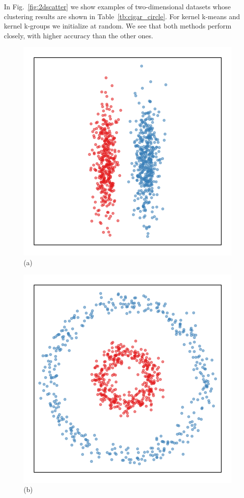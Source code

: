 \documentclass[10pt,journal,compsoc]{IEEEtran}
\begin{document}
In Fig.~\ref{fig:2dscatter} we show examples of two-dimensional
datasets whose clustering results are shown in Table~\ref{tb:cigar_circle}.
For kernel k-means and kernel k-groups we initialize at random.
We see that both methods perform closely, with higher accuracy
than the other ones.

\begin{figure}
\centering
\begin{minipage}{0.2\textwidth}
\includegraphics[width=1\textwidth]{2cigars.pdf}\\[-.2em](a)
\end{minipage}\hspace{2em}
\begin{minipage}{0.2\textwidth}
\includegraphics[width=1\textwidth]{2circles.pdf}\\[-.2em](b)

\end{minipage}
\end{figure}
\end{document}
